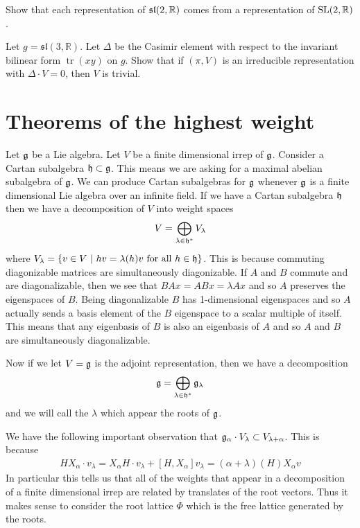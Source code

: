 \documentclass[12pt]{article}
\begin{document}
\begin{exercise}

    Show that each representation of $\mathfrak{sl}(2,\mathbb{R})$ comes from a representation of $\operatorname{SL}(2,\mathbb{R})$.
\end{exercise}

\begin{exercise}
    Let $g = \mathfrak{sl}(3, \mathbb{R})$. 
    Let $\Delta$ be the Casimir element with respect to the invariant bilinear form $\operatorname{tr}(xy)$ on $g$. 
    Show that if $(\pi, V)$ is an irreducible representation with $\Delta \cdot V = 0$, then $V$ is trivial.
\end{exercise}


\section{Theorems of the highest weight}
Let $\mathfrak{g}$ be a Lie algebra. Let $V$ be a finite dimensional irrep of $\mathfrak{g}$. 
Consider a Cartan subalgebra $\mathfrak{h}\subset \mathfrak{g}$. This means we are asking for
a maximal abelian subalgebra of $\mathfrak{g}$. We can produce Cartan subalgebras for $\mathfrak{g}$
whenever $\mathfrak{g}$ is a finite dimensional Lie algebra over an infinite field. If we have a Cartan subalgebra $\mathfrak{h}$ then we have a decomposition of $V$ into weight spaces \begin{align*}
    V = \bigoplus_{\lambda\in\mathfrak{h}^*}V_\lambda
\end{align*} where $V_\lambda = \{v\in V\ \vert \  hv = \lambda(h)v\text{ for all }h\in\mathfrak{h}\}$.
This is because commuting diagonizable matrices are simultaneously diagonizable. If $A$ and $B$ commute 
and are diagonalizable, then we see that $BAx = ABx = \lambda Ax$
and so $A$ preserves the eigenspaces of $B$. Being diagonalizable $B$ has 1-dimensional eigenspaces and
so $A$ actually sends a basis element of the $B$ eigenspace to a scalar multiple of itself. 
This means that any eigenbasis of $B$ is also an eigenbasis of $A$ and so $A$ and $B$ are simultaneously diagonalizable.



Now if we let $V = \mathfrak{g}$ is the adjoint representation, then we have a decomposition \begin{align*}
    \mathfrak{g} = \bigoplus_{\lambda\in\mathfrak{h}^*}\mathfrak{g}_\lambda
\end{align*} and we will call the $\lambda$ which appear the roots of $\mathfrak{g}$.

We have the following important observation that
 $\mathfrak{g}_\alpha \cdot V_\lambda\subset V_{\lambda + \alpha}$.
This is because \begin{align*}
    HX_\alpha\cdot v_\lambda = X_\alpha H\cdot v_\lambda + [H,X_\alpha]v_\lambda = (\alpha+\lambda)(H)X_\alpha v
\end{align*} In particular this tells us that all of the weights that appear in a decomposition
of a finite dimensional irrep are related by translates of the root vectors. Thus it makes sense to consider 
the root lattice $\Phi$ which is the free lattice generated by the roots. 
\end{document}
